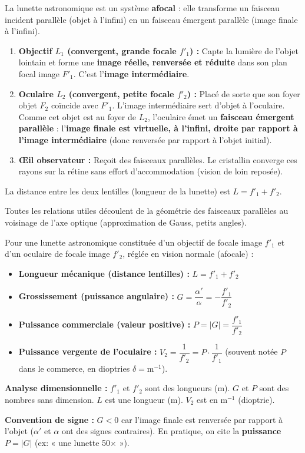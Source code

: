 \documentclass[11pt]{article}
\newcounter{popsec}
\newcounter{popsub}
\newcommand{\courssub}[1]{%
  \stepcounter{popsub}%
  \par\vspace{9pt}\noindent{\popxbold\fontsize{11.5}{13}\selectfont\color{popink}{\color{poporange}\thepopsec.\thepopsub}\hspace{6pt}#1}\par\nopagebreak\vspace{4pt}
}
\begin{document}
\begin{aretenir}
La lunette astronomique est un système \textbf{afocal} : elle transforme un faisceau incident parallèle (objet à l'infini) en un faisceau émergent parallèle (image finale à l'infini).
\begin{enumerate}
    \item \textbf{Objectif $L_1$ (convergent, grande focale $f'_1$) :} Capte la lumière de l'objet lointain et forme une \textbf{image réelle, renversée et réduite} dans son plan focal image $F'_1$. C'est l'\textbf{image intermédiaire}.
    \item \textbf{Oculaire $L_2$ (convergent, petite focale $f'_2$) :} Placé de sorte que son foyer objet $F_2$ coïncide avec $F'_1$. L'image intermédiaire sert d'objet à l'oculaire. Comme cet objet est au foyer de $L_2$, l'oculaire émet un \textbf{faisceau émergent parallèle} : l'\textbf{image finale est virtuelle, à l'infini, droite par rapport à l'image intermédiaire} (donc renversée par rapport à l'objet initial).
    \item \textbf{Œil observateur :} Reçoit des faisceaux parallèles. Le cristallin converge ces rayons sur la rétine sans effort d'accommodation (vision de loin reposée).
\end{enumerate}
La distance entre les deux lentilles (longueur de la lunette) est $L = f'_1 + f'_2$.
\end{aretenir}

\courssub{Bilan des formules fondamentales}

Toutes les relations utiles découlent de la géométrie des faisceaux parallèles au voisinage de l'axe optique (approximation de Gauss, petits angles).

\begin{propriete}
Pour une lunette astronomique constituée d'un objectif de focale image $f'_1$ et d'un oculaire de focale image $f'_2$, réglée en vision normale (afocale) :
\begin{itemize}
    \item \textbf{Longueur mécanique (distance lentilles) :} $\boxed{L = f'_1 + f'_2}$
    \item \textbf{Grossissement (puissance angulaire) :} $\boxed{G = \dfrac{\alpha'}{\alpha} = -\dfrac{f'_1}{f'_2}}$
    \item \textbf{Puissance commerciale (valeur positive) :} $\boxed{P = |G| = \dfrac{f'_1}{f'_2}}$
    \item \textbf{Puissance vergente de l'oculaire :} $\boxed{V_2 = \dfrac{1}{f'_2} = P \cdot \dfrac{1}{f'_1}}$ (souvent notée $P$ dans le commerce, en dioptries $\delta = \text{m}^{-1}$).
\end{itemize}
\textbf{Analyse dimensionnelle :} $f'_1$ et $f'_2$ sont des longueurs (m). $G$ et $P$ sont des nombres sans dimension. $L$ est une longueur (m). $V_2$ est en $\text{m}^{-1}$ (dioptrie).
\par\medskip
\textbf{Convention de signe :} $G < 0$ car l'image finale est renversée par rapport à l'objet ($\alpha'$ et $\alpha$ ont des signes contraires). En pratique, on cite la \textbf{puissance} $P = |G|$ (ex: « une lunette 50$\times$ »).
\end{propriete}
\end{document}
